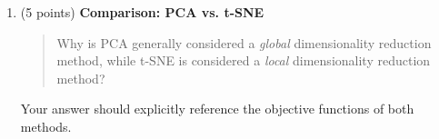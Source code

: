 \begin{enumerate}
\begin{solution}


\end{solution}

\vspace{20pt}

\item (5 points) \textbf{Comparison: PCA vs. t-SNE}

\begin{quote}
Why is PCA generally considered a \emph{global} dimensionality reduction method,
while t-SNE is considered a \emph{local} dimensionality reduction method?
\end{quote}

Your answer should explicitly reference the objective functions of both methods.

\begin{solution}

\end{solution}

\end{enumerate}
